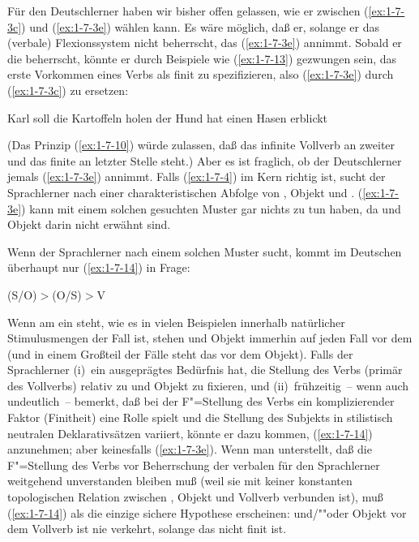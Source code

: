 \documentclass[output=paper]{langsci/langscibook}
\begin{document}
Für den Deutschlerner haben wir bisher offen gelassen, wie er zwischen (\ref{ex:1-7-3c}) und
(\ref{ex:1-7-3e}) wählen kann. Es wäre möglich, daß er, solange er das (verbale) Flexionssystem
nicht beherrscht, das  (\ref{ex:1-7-3e}) annimmt. Sobald er die  beherrscht, könnte
er durch Beispiele wie (\ref{ex:1-7-13}) gezwungen sein, das erste Vorkommen eines Verbs als finit zu spezifizieren, also (\ref{ex:1-7-3e}) durch (\ref{ex:1-7-3c}) zu ersetzen:

\begin{exe}
\ex\label{ex:1-7-13}
\begin{xlist}
\ex\label{ex:1-7-13a} Karl soll die Kartoffeln holen
\ex\label{ex:1-7-13b} der Hund hat einen Hasen erblickt
\end{xlist}
\end{exe}
(Das Prinzip (\ref{ex:1-7-10}) würde zulassen, daß das infinite Vollverb an zweiter und das finite
 an letzter Stelle steht.) Aber es ist fraglich, ob der Deutschlerner jemals (\ref{ex:1-7-3e})
annimmt. Falls (\ref{ex:1-7-4}) im Kern richtig ist, sucht der Sprachlerner nach einer charakteristischen Abfolge von , Objekt und . (\ref{ex:1-7-3e}) kann mit einem solchen gesuchten Muster gar nichts zu tun haben, da  und Objekt darin nicht erwähnt sind.

Wenn der Sprachlerner nach einem solchen Muster sucht, kommt im Deutschen
überhaupt nur (\ref{ex:1-7-14}) in Frage:
\begin{exe}
\ex\label{ex:1-7-14}
(S/O)$>$(O/S)$>$V
\end{exe}
Wenn am  ein  steht, wie es in vielen Beispielen innerhalb natürlicher
Stimulusmengen der Fall ist, stehen  und Objekt immerhin auf jeden Fall vor
dem  (und in einem Großteil der Fälle steht das  vor dem Objekt). Falls
der Sprachlerner (i)~ein ausgeprägtes Bedürfnis hat, die Stellung des Verbs (primär
des Vollverbs) relativ zu  und Objekt zu fixieren, und (ii)~frühzeitig~-- wenn
auch undeutlich~-- bemerkt, daß bei der F"=Stellung des Verbs ein komplizierender
Faktor (Finitheit) eine Rolle spielt und die Stellung des Subjekts in stilistisch neutralen Deklarativsätzen variiert, könnte er dazu kommen, (\ref{ex:1-7-14}) anzunehmen; aber keinesfalls (\ref{ex:1-7-3e}). Wenn man unterstellt, daß die F"=Stellung des Verbs vor Beherrschung
der verbalen  für den Sprachlerner weitgehend unverstanden bleiben muß
(weil sie mit keiner konstanten topologischen Relation zwischen , Objekt und
Vollverb verbunden ist), muß (\ref{ex:1-7-14}) als die einzige sichere Hypothese erscheinen:  und/""oder Objekt vor dem Vollverb ist nie verkehrt, solange das  nicht finit
ist.
\end{document}

